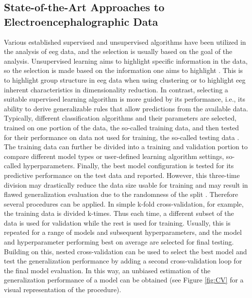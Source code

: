 \subsection{State-of-the-Art Approaches to Electroencephalographic Data}
\label{theory:ml:applications_eeg}
Various established supervised and unsupervised algorithms have been utilized in the analysis of \gls{eeg} data, and the selection is usually based on the goal of the analysis. Unsupervised learning aims to highlight specific information in the data, so the selection is made based on the information one aims to highlight \cite{Shalev2014}. This is to highlight group structure in \gls{eeg} data when using clustering or to highlight \gls{eeg} inherent characteristics in dimensionality reduction. In contrast, selecting a suitable supervised learning algorithm is more guided by its performance, i.e., its ability to derive generalizable rules that allow predictions from the available data. Typically, different classification algorithms and their parameters are selected, trained on one portion of the data, the so-called training data, and then tested for their performance on data not used for training, the so-called testing data \cite{Daumé2017}. The training data can further be divided into a training and validation portion to compare different model types or user-defined learning algorithm settings, so-called hyperparameters. Finally, the best model configuration is tested for its predictive performance on the test data and reported. However, this three-time division may drastically reduce the data size usable for training and may result in flawed generalization evaluation due to the randomness of the split \cite{Varoquaux2017}. Therefore several procedures can be applied. In simple k-fold cross-validation, for example, the training data is divided k-times. Thus each time, a different subset of the data is used for validation while the rest is used for training. Usually, this is repeated for a range of models and subsequent hyperparameters, and the model and hyperparameter performing best on average are selected for final testing. Building on this, 
nested cross-validation can be used to select the best model and test the generalization performance by adding a second cross-validation loop for the final model evaluation. In this way, an unbiased estimation of the generalization performance of a model can be obtained (see Figure \ref{fig:CV} for a visual representation of the procedure).

\begin{figure*}[ht]
\centering
   
  \caption[Exemplary nested cross-validation procedure.]{Exemplary nested cross-validation procedure. K-fold cross-validation is used in an outer loop for testing the best configuration tuned in an inner cross-validation loop. CV: cross-validation, Val: Validation}
  \label{fig:CV}
\end{figure*}

